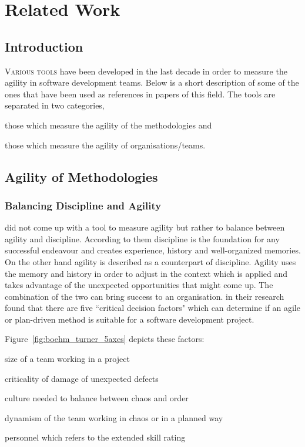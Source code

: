 \chapter{Related Work}\label{ch:related_work}

\section{Introduction}
\lettrine[lines=4, loversize=-0.1, lraise=0.1]{V}{arious tools} have been developed in the last decade in order to measure the agility in software development teams. Below is a short description of some of the ones that have been used as references in papers of this field. The tools are separated in two categories, 
\begin{inparaenum} [a\upshape)]
\item those which measure the agility of the methodologies and
\item those which measure the agility of organisations/teams.
\end{inparaenum}

\section{Agility of Methodologies}

\subsection{Balancing Discipline and Agility}
\citet{1231450} did not come up with a tool to measure agility but rather to balance between agility and discipline. According to them \cite{1317503} discipline is the foundation for any successful endeavour and creates experience, history and well-organized memories. On the other hand agility is described as a counterpart of discipline. Agility uses the memory and history in order to adjust in the context which is applied and takes advantage of the unexpected opportunities that might come up. The combination of the two can bring success to an organisation. 
\citet{1231450} in their research found that there are five ``critical decision factors" which can determine if an agile or plan-driven method is suitable for a software development project.

Figure~\ref{fig:boehm_turner_5axes} depicts these factors:
\begin{inparaenum} [a\upshape)]
\item size of a team working in a project
\item criticality of damage of unexpected defects
\item culture needed to balance between chaos and order
\item dynamism of the team working in chaos or in a planned way
\item personnel which refers to the extended \citet{cockburn2002agile} skill rating %
\end{inparaenum}

